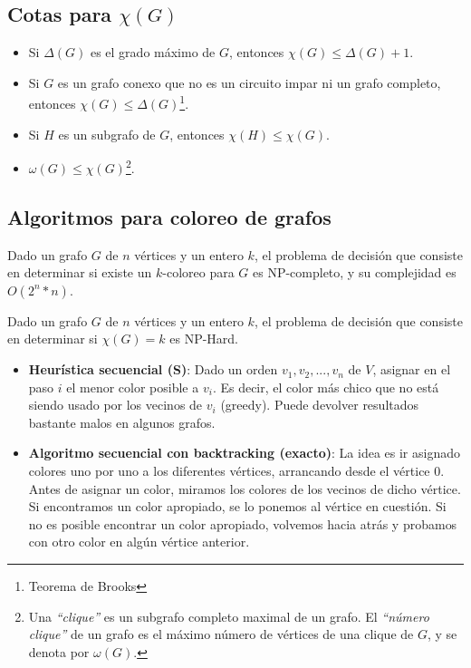 \subsection{Cotas para $\chi(G)$}
\begin{itemize}
\item Si $\Delta(G)$ es el grado m\'aximo de $G$, entonces $\chi(G) \leq \Delta(G) + 1$.
\item Si $G$ es un grafo conexo que no es un circuito impar ni un grafo completo, entonces $\chi(G) \leq \Delta(G)$\footnote{Teorema de Brooks}.
\item Si $H$ es un subgrafo de $G$, entonces $\chi(H) \leq \chi(G)$.
\item $\omega(G) \leq \chi(G)$\footnote{Una \emph{``clique''} es un subgrafo completo maximal de un grafo. El \emph{``n\'umero clique''} de un grafo es el m\'aximo n\'umero de v\'ertices de una clique de $G$, y se denota por $\omega(G)$.}.
\end{itemize}



\newpage
\subsection{Algoritmos para coloreo de grafos}

Dado un grafo $G$ de $n$ v\'ertices y un entero $k$, el problema de decisi\'on que consiste en determinar si existe un $k$-coloreo para $G$ es NP-completo, y su complejidad es $O(2^n * n)$.

Dado un grafo $G$ de $n$ v\'ertices y un entero $k$, el problema de decisi\'on que consiste en determinar si $\chi(G) = k$ es NP-Hard.

\begin{itemize}
\item \textbf{Heur\'istica secuencial (S)}: Dado un orden $v_1, v_2, ..., v_n$ de $V$, asignar en el paso $i$ el menor color posible a $v_i$. Es decir, el color m\'as chico que no est\'a siendo usado por los vecinos de $v_i$ (greedy). Puede devolver resultados bastante malos en algunos grafos.
\item \textbf{Algoritmo secuencial con backtracking (exacto)}: La idea es ir asignado colores uno por uno a los diferentes v\'ertices, arrancando desde el v\'ertice 0. Antes de asignar un color, miramos los colores de los vecinos de dicho v\'ertice. Si encontramos un color apropiado, se lo ponemos al v\'ertice en cuesti\'on. Si no es posible encontrar un color apropiado, volvemos hacia atr\'as y probamos con otro color en alg\'un v\'ertice anterior.
\end{itemize}


